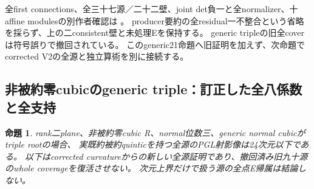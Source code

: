 \documentclass[a4paper,11pt]{ltjsarticle}
\newtheorem{proposition}{命題}[section]
\theoremstyle{definition}
\begin{document}
全first connections、全三十七源／二十二壁、joint det負一と全normalizer、十affine modulesの別作者確認は
。
producer要約の全residual一不整合という省略を採らず、上の二consistent壁と未処理Eを保持する。
generic tripleの旧全coverは符号誤りで撤回されている。
このgeneric21命題へ旧証明を加えず、次命題でcorrected V2の全源と独立算術を別に接続する。

\subsection{非被約零cubicのgeneric triple：訂正した全八係数と全支持}
\begin{proposition}\label{prop:plane-nonreduced-m3-generic-triple-G}
rank二plane、非被約零cubic R、normal位数三、generic normal cubicがtriple rootの場合、
実既約被約quinticを持つ全源のPGL射影像は24次元以下である。
以下はcorrected curvatureからの新しい全源証明であり、撤回済み旧九十源のwhole coverageを復活させない。
次元上界だけで扱う源の全点E帰属は結論しない。
\end{proposition}
\end{document}
